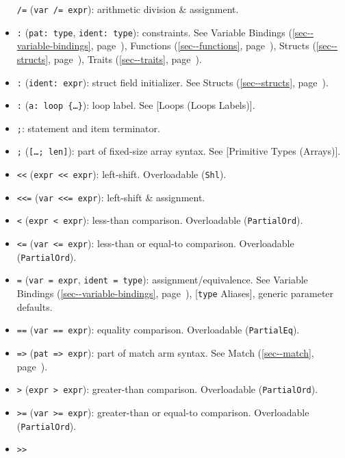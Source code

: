 \documentclass[a4paper,]{book}
\renewcommand*{\hyperref}[2][\ar]{%
  \def\ar{#2}%
  #2 (\autoref{#1}, page~\pageref{#1})}
\begin{document}
\begin{itemize}
  \texttt{/=} (\texttt{var\ /=\ expr}): arithmetic division \&
  assignment.
\item
  \texttt{:} (\texttt{pat:\ type}, \texttt{ident:\ type}): constraints.
  See \hyperref[sec--variable-bindings]{Variable Bindings},
  \hyperref[sec--functions]{Functions},
  \hyperref[sec--structs]{Structs}, \hyperref[sec--traits]{Traits}.
\item
  \texttt{:} (\texttt{ident:\ expr}): struct field initializer. See
  \hyperref[sec--structs]{Structs}.
\item
  \texttt{:} (\texttt{\textquotesingle{}a:\ loop\ \{\ldots{}\}}): loop
  label. See {[}Loops (Loops Labels){]}.
\item
  \texttt{;}: statement and item terminator.
\item
  \texttt{;} (\texttt{{[}\ldots{};\ len{]}}): part of fixed-size array
  syntax. See {[}Primitive Types (Arrays){]}.
\item
  \texttt{\textless{}\textless{}}
  (\texttt{expr\ \textless{}\textless{}\ expr}): left-shift.
  Overloadable (\texttt{Shl}).
\item
  \texttt{\textless{}\textless{}=}
  (\texttt{var\ \textless{}\textless{}=\ expr}): left-shift \&
  assignment.
\item
  \texttt{\textless{}} (\texttt{expr\ \textless{}\ expr}): less-than
  comparison. Overloadable (\texttt{PartialOrd}).
\item
  \texttt{\textless{}=} (\texttt{var\ \textless{}=\ expr}): less-than or
  equal-to comparison. Overloadable (\texttt{PartialOrd}).
\item
  \texttt{=} (\texttt{var\ =\ expr}, \texttt{ident\ =\ type}):
  assignment/equivalence. See \hyperref[sec--variable-bindings]{Variable
  Bindings}, {[}\texttt{type} Aliases{]}, generic parameter defaults.
\item
  \texttt{==} (\texttt{var\ ==\ expr}): equality comparison.
  Overloadable (\texttt{PartialEq}).
\item
  \texttt{=\textgreater{}} (\texttt{pat\ =\textgreater{}\ expr}): part
  of match arm syntax. See \hyperref[sec--match]{Match}.
\item
  \texttt{\textgreater{}} (\texttt{expr\ \textgreater{}\ expr}):
  greater-than comparison. Overloadable (\texttt{PartialOrd}).
\item
  \texttt{\textgreater{}=} (\texttt{var\ \textgreater{}=\ expr}):
  greater-than or equal-to comparison. Overloadable
  (\texttt{PartialOrd}).
\item
  \texttt{\textgreater{}\textgreater{}}

\end{itemize}
\end{document}
